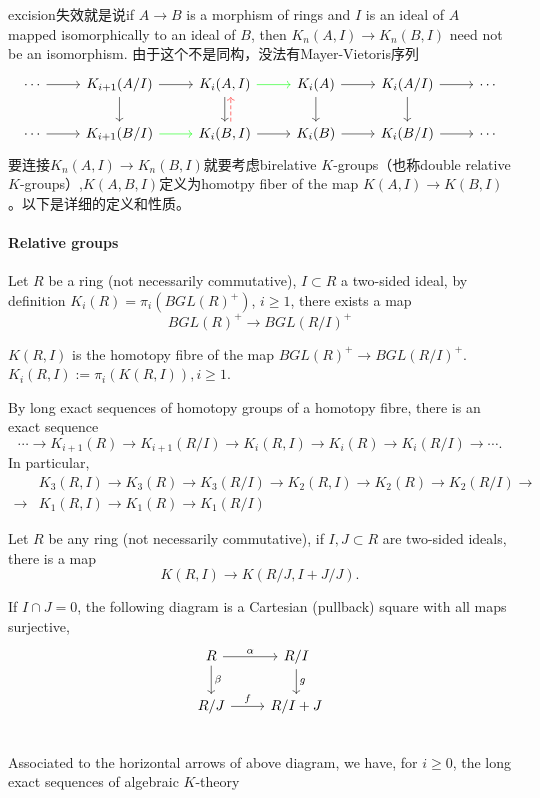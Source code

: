 excision失效就是说if $A \longrightarrow B$ is a morphism of rings and $I$ is an ideal of $A$ mapped isomorphically to an ideal of $B$,
then $K_n(A, I) \longrightarrow K_n(B, I)$ need not be an isomorphism. 由于这个不是同构，没法有Mayer-Vietoris序列
	\[\begin{tikzcd}
	\cdots \ar[r]&K_{i+1}(A/I) \ar[r] \ar[d]&	K_i(A,I) \ar[r,green] \ar[d]& K_i(A)\ar[r]\ar[d] & K_i(A/I)\ar[r] \ar[d] & \cdots\\
 \cdots \ar[r]&K_{i+1}(B/I) \ar[r,green] &	K_i(B,I) \ar[r] \ar[u, dashrightarrow, red, xshift=1ex] & K_i(B)\ar[r] & K_i(B/I)\ar[r] & \cdots
	\end{tikzcd}\]
要连接$K_n(A, I) \longrightarrow K_n(B, I)$就要考虑birelative $K$-groups（也称double relative $K$-groups）,$K(A,B,I)$定义为homotpy fiber of the map $K(A, I) \longrightarrow K(B, I)$。以下是详细的定义和性质。
\paragraph{Relative groups} %
\label{par:relative_groups}
Let $R$ be a ring (not necessarily commutative), $I\subset R$ a two-sided ideal, by definition $K_i(R)=\pi_i(BGL(R)^+)$, $i\geq 1$, there exists a map
\[BGL(R)^+ \longrightarrow BGL(R/I)^+\]
\begin{definition}
	$K(R,I)$ is the homotopy fibre of the map $BGL(R)^+ \longrightarrow BGL(R/I)^+$. $K_i(R,I):=\pi_i(K(R,I)), i\geq 1$.
\end{definition}

By long exact sequences of homotopy groups of a homotopy fibre, there is an exact sequence
\[\cdots \longrightarrow K_{i+1}(R)\longrightarrow K_{i+1}(R/I) \longrightarrow K_i(R,I)\longrightarrow K_i(R)\longrightarrow K_i(R/I)\longrightarrow \cdots.\]
In particular,
\begin{align*}
&K_3(R,I)\longrightarrow K_3(R)\longrightarrow K_3(R/I) \longrightarrow K_2(R,I)\longrightarrow K_2(R)\longrightarrow K_2(R/I)\longrightarrow\\
\longrightarrow & K_1(R,I)\longrightarrow K_1(R)\longrightarrow K_1(R/I)
\end{align*}

Let $R$ be any ring (not necessarily commutative), if $I,J\subset R$ are two-sided ideals, there is a map
\[K(R,I)\longrightarrow K(R/J,I+J/J).\]

If $I\cap J =0$, the following diagram is a Cartesian (pullback) square with all maps surjective,
	\[\begin{tikzcd}
		R \ar[r,"\alpha"] \ar[d,"\beta"]& R/I\ar[d,"g"]\\
		R/J \ar[r,"f"] & R/I+J\\
	\end{tikzcd}\]
Associated to the horizontal arrows of above diagram, we have, for $i \geq 0$, the long exact sequences of algebraic $K$-theory 

